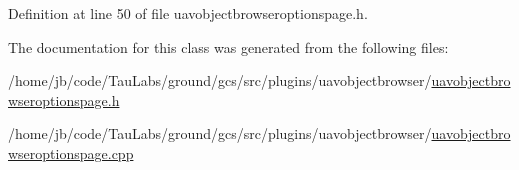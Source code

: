 \-Definition at line 50 of file uavobjectbrowseroptionspage.\-h.



\-The documentation for this class was generated from the following files\-:\begin{DoxyCompactItemize}
\item 
/home/jb/code/\-Tau\-Labs/ground/gcs/src/plugins/uavobjectbrowser/\hyperlink{uavobjectbrowseroptionspage_8h}{uavobjectbrowseroptionspage.\-h}\item 
/home/jb/code/\-Tau\-Labs/ground/gcs/src/plugins/uavobjectbrowser/\hyperlink{uavobjectbrowseroptionspage_8cpp}{uavobjectbrowseroptionspage.\-cpp}\end{DoxyCompactItemize}
